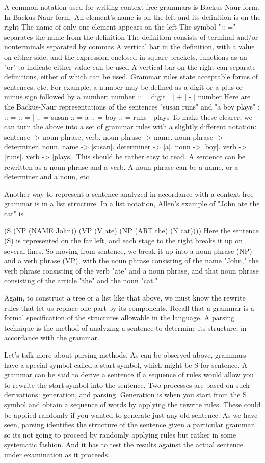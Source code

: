 A common notation used for writing context-free grammars is Backus-Naur form. In Backus-Naur form:
An element's name is on the left and its definition is on the right
The name of only one element appears on the left
The symbol ":: =" separates the name from the definition
The definition consists of terminal and/or nonterminals separated by commas
A vertical bar in the definition, with a value on either side, and the expression enclosed in square brackets, functions as an "or" to indicate either value can be used
A vertical bar on the right can separate definitions, either of which can be used.
Grammar rules state acceptable forms of sentences, etc.
For example, a number may be defined as a digit or a plus or minus sign followed by a number:
number :: = digit | [ + | - ] number
Here are the Backus-Naur representations of the sentences "susan runs" and "a boy plays" :
 :: =  
 :: =  |  
 :: = susan
 :: = a
 :: = boy
 :: = runs | plays
To make these clearer, we can turn the above into a set of grammar rules with a slightly different notation:
sentence -> noun-phrase,  verb.
noun-phrase -> name.
noun-phrase -> determiner, noun.
name -> [susan].
determiner -> [a].
noun -> [boy].
verb -> [runs].
verb -> [plays].
This should be rather easy to read. A sentence can be rewritten as a noun-phrase and a verb. A noun-phrase can be a name, or a determiner and a noun, etc.

Another way to represent a sentence analyzed in accordance with a context free grammar is in a list structure. In a list notation, Allen's example of "John ate the cat" is

(S	(NP	(NAME John))
	(VP	(V ate)
		(NP	(ART the)
			(N cat))))
Here the sentence (S) is represented on the far left, and each stage to the right breaks it up on several lines. So moving from sentence, we break it up into a noun phrase (NP) and a verb phrase (VP), with the noun phrase consisting of the name "John," the verb phrase consisting of the verb "ate" and a noun phrase, and that noun phrase consisting of the article "the" and the noun "cat."

Again, to construct a tree or a list like that above, we must know the rewrite rules that let us replace one part by its components. Recall that a grammar is a formal specification of the structures allowable in the language. A parsing technique is the method of analyzing a sentence to determine its structure, in accordance with the grammar.

Let's talk more about parsing methods. As can be observed above, grammars have a special symbol called a start symbol, which might be S for sentence. A grammar can be said to derive a sentence if a sequence of rules would allow you to rewrite the start symbol into the sentence. Two processes are based on such derivations: generation, and parsing. Generation is when you start from the S symbol and obtain a sequence of words by applying the rewrite rules. These could be applied randomly if you wanted to generate just any old sentence. As we have seen, parsing identifies the structure of the sentence given a particular grammar, so its not going to proceed by randomly applying rules but rather in some systematic fashion. And it has to test the results against the actual sentence under examination as it proceeds.

